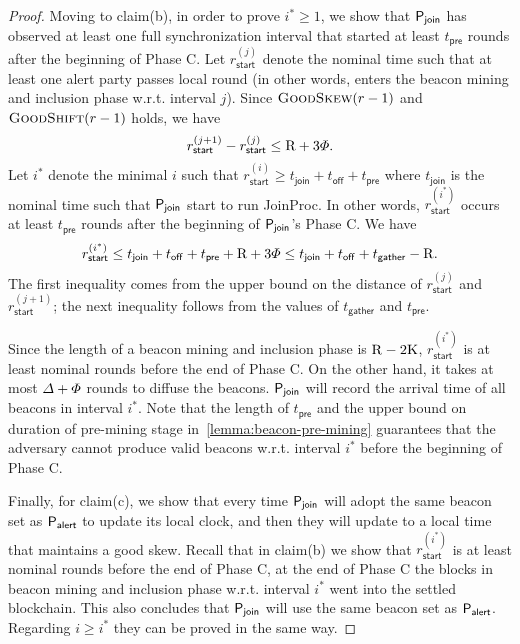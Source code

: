 \begin{proof}
    Moving to claim(b), in order to prove $i^* \ge 1$, we show that $\mathsf{P}_{\mathsf{join}}$ has observed at least one full synchronization interval that started at least $t_{\mathsf{pre}}$ rounds after the beginning of Phase C.
    Let $r_{\mathsf{start}}^{(j)}$ denote the nominal time such that at least one alert party passes local round  (in other words, enters the beacon mining and inclusion phase w.r.t. interval $j$).
    Since $\textsc{GoodSkew}(r - 1)$ and $\textsc{GoodShift}(r - 1)$ holds, we have
    \[ r_{\mathsf{start}}^{(j + 1)} - r_{\mathsf{start}}^{(j)} \le \mathrm{R} + 3\varPhi. \]
    Let $i^*$ denote the minimal $i$ such that $r_{\mathsf{start}}^{(i)} \ge t_{\mathsf{join}} + t_{\mathsf{off}} + t_{\mathsf{pre}}$ where $t_{\mathsf{join}}$ is the nominal time such that $\mathsf{P}_{\mathsf{join}}$ start to run \textsf{JoinProc}.
    In other words, $r_{\mathsf{start}}^{(i^*)}$ occurs at least $t_{\mathsf{pre}}$ rounds after the beginning of $\mathsf{P}_{\mathsf{join}}$'s Phase C.
    We have
    \[ r_{\mathsf{start}}^{(i^*)} \le t_{\mathsf{join}} + t_{\mathsf{off}} + t_{\mathsf{pre}} + \mathrm{R} + 3\varPhi \le t_{\mathsf{join}} + t_{\mathsf{off}} + t_{\mathsf{gather}} - \mathrm{R}. \]
    The first inequality comes from the upper bound on the distance of $r_{\mathsf{start}}^{(j)}$ and $r_{\mathsf{start}}^{(j + 1)}$; the next inequality follows from the values of $t_{\mathsf{gather}}$ and $t_{\mathsf{pre}}$.

    Since the length of a beacon mining and inclusion phase is $\mathrm{R} - 2\mathrm{K}$, $r_{\mathsf{start}}^{(i^*)}$ is at least \syncLen nominal rounds before the end of Phase C.
    On the other hand, it takes at most $\varDelta + \varPhi$ rounds to diffuse the beacons.
    $\mathsf{P}_{\mathsf{join}}$ will record the arrival time of all beacons in interval $i^*$.
    Note that the length of $t_{\mathsf{pre}}$ and the upper bound on duration of pre-mining stage in~\cref{lemma:beacon-pre-mining} guarantees that the adversary cannot produce valid beacons w.r.t. interval $i^*$ before the beginning of Phase C.

    Finally, for claim(c), we show that every time $\mathsf{P}_{\mathsf{join}}$ will adopt the same beacon set as $\mathsf{P}_{\mathsf{alert}}$ to update its local clock, and then they will update to a local time that maintains a good skew.
    Recall that in claim(b) we show that $r_{\mathsf{start}}^{(i^*)}$ is at least \syncLen nominal rounds before the end of Phase C, at the end of Phase C the blocks in beacon mining and inclusion phase w.r.t. interval $i^*$ went into the settled blockchain.
    This also concludes that $\mathsf{P}_{\mathsf{join}}$ will use the same beacon set as $\mathsf{P}_{\mathsf{alert}}$.
    Regarding $i \ge i^*$ they can be proved in the same way.


\end{proof}

